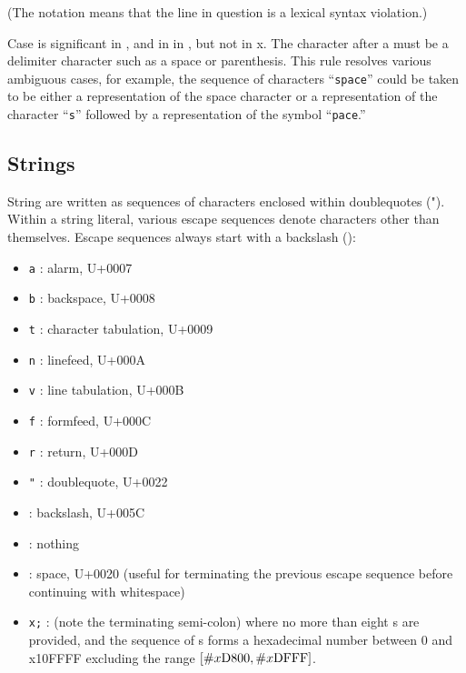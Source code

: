 (The notation  means that the line in question is
a lexical syntax violation.)

Case is significant in \sharpsign\backwhack{}, and in in
\sharpsign{}, %
but not in \sharpsign\backwhack{}x.  
The character after a 
must be a delimiter character such as a
space or parenthesis.  This rule resolves various ambiguous cases, for
example, the sequence of characters ``{\tt\sharpsign\backwhack space}''
could be taken to be either a representation of the space character or a
representation of the character ``{\tt\sharpsign\backwhack s}'' followed
by a representation of the symbol ``{\tt pace}.''

\subsection{Strings}

\vest String are written as sequences of characters enclosed within doublequotes
({\cf "}).  Within a string literal, various escape
sequences denote characters other than
themselves.  Escape sequences always start with a backslash (\backwhack{}):

\begin{itemize}
\item{\tt \backwhack{}a} : alarm, U+0007
\item{\tt \backwhack{}b} : backspace, U+0008 
\item{\tt \backwhack{}t} : character tabulation, U+0009 
\item{\tt \backwhack{}n} : linefeed, U+000A 
\item{\tt \backwhack{}v} : line tabulation, U+000B 
\item{\tt \backwhack{}f} : formfeed, U+000C 
\item{\tt \backwhack{}r} : return, U+000D 
\item{\tt \backwhack{}}\verb|"| : doublequote, U+0022 
\item{\tt \backwhack{}\backwhack{}} : backslash, U+005C 
\item{\tt \backwhack{}} : nothing
\item{\tt \backwhack{}} : space, U+0020 (useful for terminating the
  previous escape sequence before continuing with whitespace)
\item{\tt \backwhack{}x;} : (note the
  terminating semi-colon) where no more than eight s
  are provided, and the sequence of s forms a
  hexadecimal number between 0 and \sharpsign{}x10FFFF excluding the
  range $\left[{\tt\#}{}x\textrm{D800},
    {\tt\#}{}x\textrm{DFFF}\right]$.
\end{itemize}

